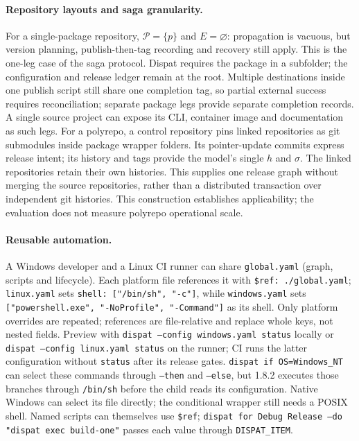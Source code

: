 \documentclass[10pt,conference]{IEEEtran}
\theoremstyle{definition}
\newcommand{\code}[1]{\texttt{#1}}
\begin{document}
\paragraph{Repository layouts and saga granularity.}
For a single-package repository, $\mathcal{P}=\{p\}$ and $E=\varnothing$:
propagation is vacuous, but version planning, publish-then-tag recording and
recovery still apply. This is the one-leg case of the saga protocol. Dispat
requires the package in a subfolder; the configuration and release ledger
remain at the root. Multiple destinations inside one publish script still
share one completion tag, so partial external success requires reconciliation;
separate package legs provide separate completion records. A single source
project can expose its CLI, container image and documentation as such legs.
For a polyrepo, a control repository pins linked repositories as git submodules
inside package wrapper folders. Its pointer-update commits express release
intent; its history and tags provide the model's single $h$ and $\sigma$.
The linked repositories retain their own histories. This supplies one release
graph without merging the source repositories, rather than a distributed
transaction over independent git histories. This construction establishes
applicability; the evaluation does not measure polyrepo operational scale.

\paragraph{Reusable automation.}
A Windows developer and a Linux CI runner can share \code{global.yaml}
(graph, scripts and lifecycle). Each platform file references it with
\code{\$ref: ./global.yaml}; \code{linux.yaml} sets
\code{shell: ["/bin/sh", "-c"]}, while \code{windows.yaml} sets
\code{["powershell.exe", "-NoProfile", "-Command"]} as its shell.
Only platform overrides are repeated; references are file-relative and
replace whole keys, not nested fields. Preview with
\code{dispat --config windows.yaml status} locally or
\code{dispat --config linux.yaml status} on the runner; CI runs the latter
configuration without \code{status} after its release gates.
\code{dispat if OS=Windows\_NT} can select these commands through
\code{--then} and \code{--else}, but 1.8.2 executes those branches through
\code{/bin/sh} before the child reads its configuration. Native Windows can
select its file directly; the conditional wrapper still needs a POSIX shell.
Named scripts can themselves use \code{\$ref};
\code{dispat for Debug Release --do "dispat exec build-one"}
passes each value through \code{DISPAT\_ITEM}.
\end{document}
